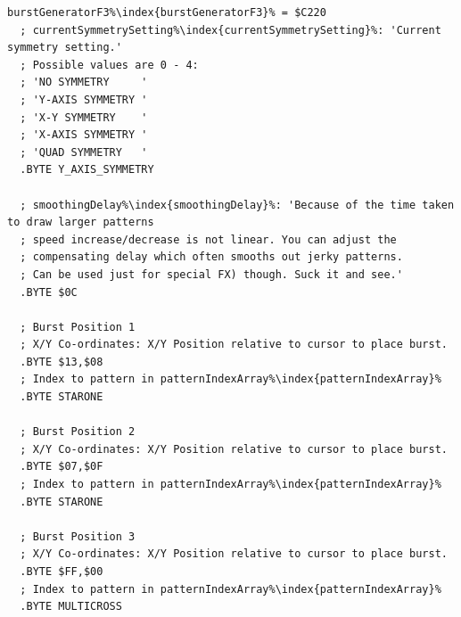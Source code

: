 \begin{lstlisting}[caption=Source code for the F3 Burst.,escapechar=\%]
burstGeneratorF3%\index{burstGeneratorF3}% = $C220
  ; currentSymmetrySetting%\index{currentSymmetrySetting}%: 'Current symmetry setting.'
  ; Possible values are 0 - 4:
  ; 'NO SYMMETRY     '
  ; 'Y-AXIS SYMMETRY '
  ; 'X-Y SYMMETRY    '
  ; 'X-AXIS SYMMETRY '
  ; 'QUAD SYMMETRY   '
  .BYTE Y_AXIS_SYMMETRY

  ; smoothingDelay%\index{smoothingDelay}%: 'Because of the time taken to draw larger patterns
  ; speed increase/decrease is not linear. You can adjust the 
  ; compensating delay which often smooths out jerky patterns.
  ; Can be used just for special FX) though. Suck it and see.'
  .BYTE $0C

  ; Burst Position 1
  ; X/Y Co-ordinates: X/Y Position relative to cursor to place burst.
  .BYTE $13,$08
  ; Index to pattern in patternIndexArray%\index{patternIndexArray}%
  .BYTE STARONE

  ; Burst Position 2
  ; X/Y Co-ordinates: X/Y Position relative to cursor to place burst.
  .BYTE $07,$0F
  ; Index to pattern in patternIndexArray%\index{patternIndexArray}%
  .BYTE STARONE

  ; Burst Position 3
  ; X/Y Co-ordinates: X/Y Position relative to cursor to place burst.
  .BYTE $FF,$00
  ; Index to pattern in patternIndexArray%\index{patternIndexArray}%
  .BYTE MULTICROSS

\end{lstlisting}

